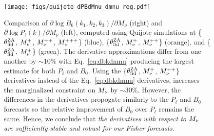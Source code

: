 \begin{figure}
\begin{center}
    \texttt{[image: figs/quijote\_dPBdMnu\_dmnu\_reg.pdf]} 
    \caption{Comparison of $\partial \log B_0(k_1, k_2, k_3)/\partial M_\nu$ (right) 
    and $\partial \log P_\ell(k)/\partial M_\nu$ (left), computed using Quijote simulations 
    at \{$\theta_{\rm fid}^{\rm ZA}$, $M_\nu^{+}$, $M_\nu^{++}$, $M_\nu^{+++}$\} (blue), 
    \{$\theta_{\rm fid}^{\rm ZA}$, $M_\nu^{+}$, $M_\nu^{++}$\} (orange), and \{$\theta_{\rm fid}^{\rm ZA}$, $M_\nu^{+}$\} 
    (green). The derivative approximations differ from one another by $\sim10\%$ with 
    Eq.~\ref{eq:dbkdmnu} producing the largest estimate for both $P_\ell$ and $B_0$.
    Using the \{$\theta_{\rm fid}^{\rm ZA}$, $M_\nu^{+}$, $M_\nu^{++}$\} derivatives instead of the 
    Eq.~\ref{eq:dbkdmnu} derivatives, increases the marginalized constraint on $M_\nu$ 
    by $\sim 30\%$. However, the differences in the derivatives propogate similarly to 
    the $P_\ell$ and $B_0$ forecasts so the relative improvement of $B_0$ over $P_\ell$
    remains the same. Hence, we conclude that {\em the derivatives with respect to $M_\nu$ 
    are sufficiently stable and robust for our Fisher forecasts}.
    }
\label{fig:dPBdmnu}
\end{center}
\end{figure}
